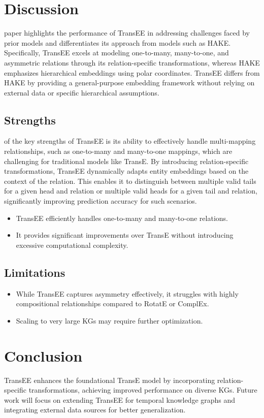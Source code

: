 \documentclass[11pt]{article}
\begin{document}
{\section{Discussion}\nThis paper highlights the performance of TransEE in addressing challenges faced by prior models and differentiates its approach from models such as HAKE. Specifically, TransEE excels at modeling one-to-many, many-to-one, and asymmetric relations through its relation-specific transformations, whereas HAKE emphasizes hierarchical embeddings using polar coordinates. TransEE differs from HAKE by providing a general-purpose embedding framework without relying on external data or specific hierarchical assumptions.
\subsection{Strengths}\nOne of the key strengths of TransEE is its ability to effectively handle multi-mapping relationships, such as one-to-many and many-to-one mappings, which are challenging for traditional models like TransE. By introducing relation-specific transformations, TransEE dynamically adapts entity embeddings based on the context of the relation. This enables it to distinguish between multiple valid tails for a given head and relation or multiple valid heads for a given tail and relation, significantly improving prediction accuracy for such scenarios.
\begin{itemize}
\item TransEE efficiently handles one-to-many and many-to-one relations.
\item It provides significant improvements over TransE without introducing excessive computational complexity.
\end{itemize}


\subsection{Limitations}
\begin{itemize}
\item While TransEE captures asymmetry effectively, it struggles with highly compositional relationships compared to RotatE or ComplEx.
\item Scaling to very large KGs may require further optimization.
\end{itemize}

\section{Conclusion}
TransEE enhances the foundational TransE model by incorporating relation-specific transformations, achieving improved performance on diverse KGs. Future work will focus on extending TransEE for temporal knowledge graphs and integrating external data sources for better generalization.

}
\end{document}
